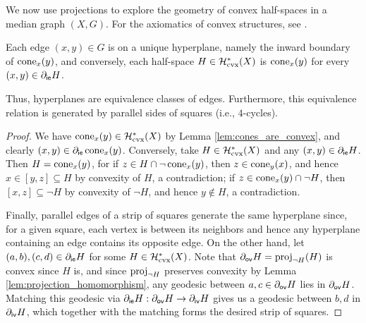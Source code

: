 \documentclass[reqno]{amsart}
\begin{document}
    We now use projections to explore the geometry of convex half-spaces in a median graph $(X,G)$. For the axiomatics of convex structures, see \cite{vdV93}.

    \begin{proposition}\label{prp:half-spaces_are_cones}
        Each edge $(x,y)\in G$ is on a unique hyperplane, namely the inward boundary of $\operatorname{cone}_x(y)$, and conversely, each half-space $H\in\mathcal{H}^\ast_\mathrm{cvx}(X)$ is $\operatorname{cone}_x(y)$ for every $(x,y)\in\partial_\mathsf{ie}H$.

        Thus, hyperplanes are equivalence classes of edges. Furthermore, this equivalence relation is generated by parallel sides of squares (i.e., $4$-cycles).
    \end{proposition}
    \begin{proof}
        We have $\operatorname{cone}_x(y)\in\mathcal{H}_\mathrm{cvx}^\ast(X)$ by Lemma \ref{lem:cones_are_convex}, and clearly $(x,y)\in\partial_\mathsf{ie}\operatorname{cone}_x(y)$. Conversely, take $H\in\mathcal{H}_\mathrm{cvx}^\ast(X)$ and any $(x,y)\in\partial_\mathsf{ie}H$. Then $H=\operatorname{cone}_x(y)$, for if $z\in H\cap\lnot\operatorname{cone}_x(y)$, then $z\in\operatorname{cone}_y(x)$, and hence $x\in[y,z]\subseteq H$ by convexity of $H$, a contradiction; if $z\in\operatorname{cone}_x(y)\cap\lnot H$, then $[x,z]\subseteq\lnot H$ by convexity of $\lnot H$, and hence $y\not\in H$, a contradiction.

        Finally, parallel edges of a strip of squares generate the same hyperplane since, for a given square, each vertex is between its neighbors and hence any hyperplane containing an edge contains its opposite edge. On the other hand, let $(a,b),(c,d)\in\partial_\mathsf{ie}H$ for some $H\in\mathcal{H}_\mathrm{cvx}^\ast(X)$. Note that $\partial_\mathsf{ov}H=\operatorname{proj}_{\lnot H}(H)$ is convex since $H$ is, and since $\operatorname{proj}_{\lnot H}$ preserves convexity by Lemma \ref{lem:projection_homomorphism}, any geodesic between $a,c\in\partial_\mathsf{ov}H$ lies in $\partial_\mathsf{ov}H$. Matching this geodesic via $\partial_\mathsf{ie}H:\partial_\mathsf{ov}H\to\partial_\mathsf{iv}H$ gives us a geodesic between $b,d$ in $\partial_\mathsf{iv}H$, which together with the matching forms the desired strip of squares.
    \end{proof}
\end{document}

